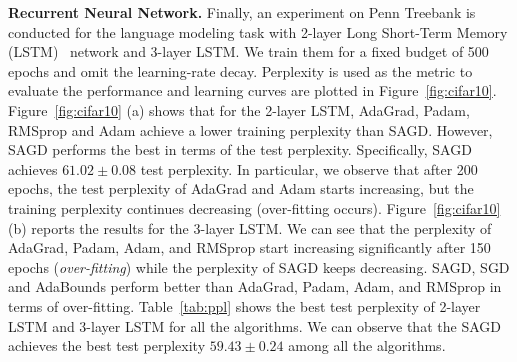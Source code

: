 \documentclass[11pt]{article}
\begin{document}
\textbf{Recurrent Neural Network.}
Finally, an experiment on Penn Treebank is conducted for the language modeling task with 2-layer Long Short-Term Memory (LSTM)~\citep{stni2018} network and 3-layer LSTM. We train them for a fixed budget of 500 epochs and omit the learning-rate decay. Perplexity is used as the metric to evaluate the performance and learning curves are plotted in Figure~\ref{fig:cifar10}. 
Figure~\ref{fig:cifar10} (a) shows that for the 2-layer LSTM, AdaGrad, Padam, RMSprop and Adam achieve a lower training perplexity than \textsc{SAGD}. However, \textsc{SAGD} performs the best in terms of the test perplexity. Specifically, \textsc{SAGD} achieves $61.02 \pm 0.08$ test perplexity. 
In particular, we observe that after 200 epochs, the test perplexity of AdaGrad and Adam starts increasing, but the training perplexity continues decreasing (over-fitting occurs).  
Figure~\ref{fig:cifar10} (b) reports the results for the 3-layer LSTM. We can see that the perplexity of AdaGrad, Padam, Adam, and RMSprop start increasing significantly after 150 epochs (\emph{over-fitting}) while the perplexity of \textsc{SAGD} keeps decreasing. \textsc{SAGD}, SGD and AdaBounds perform better than AdaGrad, Padam, Adam, and RMSprop in terms of over-fitting.
Table~\ref{tab:ppl} shows the best test perplexity of 2-layer LSTM and 3-layer LSTM for all the algorithms. We can observe that the \textsc{SAGD} achieves the best test perplexity $59.43 \pm 0.24$ among all the algorithms. 

\begin{table}[H]
\small
\caption{ Test Perplexity of LSTMs on Penn Treebank. Bold number indicates the best result.}\label{tab:ppl}
	\vspace{-0.1in}
\end{table}


\vspace{-0.05in}
\end{document}
